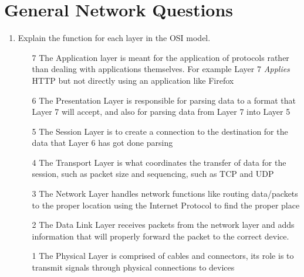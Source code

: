\documentclass{exam}
\begin{document}
	\section*{General Network Questions}
		\begin{enumerate}
		\item Explain the function for each layer in the OSI model.
		\begin{solution}
			\begin{enumerate}
				\item[7]The Application layer is meant for the application of protocols rather than dealing with applications themselves. For example Layer 7 \textit{Applies} HTTP but not directly using an application like Firefox 
				\item[6] The Presentation Layer is responsible for parsing data to a format that Layer 7 will accept, and also for parsing data from Layer 7 into Layer 5 
				\item[5] The Session Layer is to create a connection to the destination for the data that Layer 6 has got done parsing 
				\item[4] The Transport Layer is what coordinates the transfer of data for the session, such as packet size and sequencing, such as TCP and UDP
				\item[3] The Network Layer handles network functions like routing data/packets to the proper location using the Internet Protocol to find the proper place 
				\item[2] The Data Link Layer receives packets from the network layer and adds information that will properly forward the packet to the correct device.   
				\item[1] The Physical Layer is comprised of cables and connectors, its role is to transmit signals through physical connections to devices
				

\end{enumerate}
\end{solution}
\end{enumerate}
\end{document}
